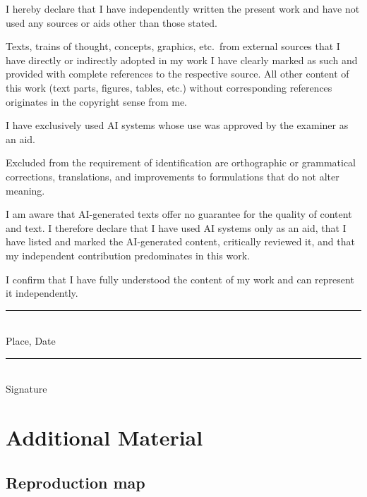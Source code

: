 \documentclass[a4paper,12pt]{article}
\begin{document}
\medskip
I hereby declare that I have independently written the present work and have not used any sources or aids other than
those stated.

Texts, trains of thought, concepts, graphics, etc.\ from external sources that I have directly or
indirectly adopted in my work I have clearly marked as such and provided with complete references
to the respective source. All other content of this work (text parts, figures, tables, etc.)
without corresponding references originates in the copyright sense from me.

I have exclusively used AI systems whose use was approved by the examiner as an aid.

Excluded from the requirement of identification are orthographic or grammatical corrections,
translations, and improvements to formulations that do not alter meaning.

I am aware that AI-generated texts offer no guarantee for the quality of content and text.
I therefore declare that I have used AI systems only as an aid, that I have listed and marked the
AI-generated content, critically reviewed it, and that my independent contribution predominates in
this work.

I confirm that I have fully understood the content of my work and can represent it independently.

\vspace{3cm}

\noindent
\begin{minipage}[t]{0.42\linewidth}
  \rule{\linewidth}{0.4pt}\\[0.2em]{\small Place, Date}
\end{minipage}\hfill
\begin{minipage}[t]{0.42\linewidth}
  \rule{\linewidth}{0.4pt}\\[0.2em]{\small Signature}
\end{minipage}


\clearpage
\appendix

\section{Additional Material}
\label{sec:additional}

\subsection{Reproduction map}
\end{document}
